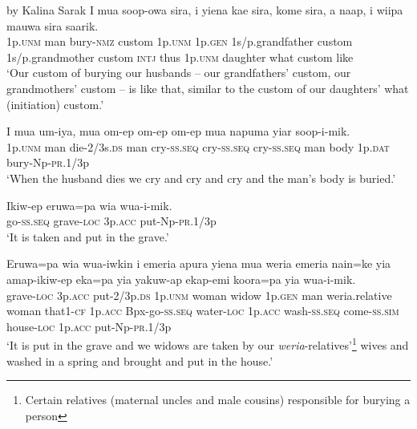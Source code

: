  by Kalina Sarak
\ea\label{ex:a:x1}
\gll  I  mua  soop-owa  sira,  i  yiena  kae  sira,                    kome  sira,  a  naap,  i  wiipa  mauwa  sira  saarik. \\
1p.\textsc{unm}  man  bury-\textsc{nmz}  custom  1p.\textsc{unm}  1p.\textsc{gen}  1s/p.grandfather  custom 1s/p.grandmother  custom  \textsc{intj}  thus  1p.\textsc{unm}  daughter  what  custom  like \\


\glt ‘Our custom of burying our husbands – our grandfathers’ custom, our grandmothers’ custom – is like that, similar to the custom of our daughters’ what (initiation) custom.’ \\
\z


\ea\label{ex:a:x2}
\gll  I  mua  um-iya,  mua  om-ep  om-ep  om-ep  mua                    napuma  yiar  soop-i-mik. \\
1p.\textsc{unm}  man  die-2/3s.\textsc{ds}  man  cry-\textsc{ss.seq}  cry-\textsc{ss.seq}  cry-\textsc{ss.seq}  man  body  1p.\textsc{dat}  bury-Np-\textsc{pr}.1/3p \\


\glt ‘When the husband dies we cry and cry and cry and the man’s body is buried.’ \\
\z


\ea\label{ex:a:x3}
\gll  Ikiw-ep  eruwa=pa  wia  wua-i-mik. \\
go-\textsc{ss.seq}  grave-\textsc{loc}  3p.\textsc{acc}  put-Np-\textsc{pr}.1/3p \\
\glt ‘It is taken and put in the grave.’ \\
\z


\ea\label{ex:a:x4}
\gll  Eruwa=pa  wia  wua-iwkin  i  emeria  apura  yiena      mua  weria  emeria  nain=ke  yia  amap-ikiw-ep  eka=pa                  yia  yakuw-ap  ekap-emi  koora=pa  yia  wua-i-mik. \\
grave-\textsc{loc}  3p.\textsc{acc}  put-2/3p.\textsc{ds}  1p.\textsc{unm}  woman  widow  1p.\textsc{gen} man  weria.relative  woman  that1-\textsc{cf}  1p.\textsc{acc}  Bpx-go-\textsc{ss.seq}  water-\textsc{loc}  1p.\textsc{acc}  wash-\textsc{ss.seq}  come-\textsc{ss}.\textsc{sim}  house-\textsc{loc}  1p.\textsc{acc}  put-Np-\textsc{pr}.1/3p \\




\glt ‘It is put in the grave and we widows are taken by our \textit{weria}{}-relatives’\footnote{ Certain relatives (maternal uncles and male cousins) responsible for burying a person} wives and washed in a spring and brought and put in the house.’ \\
\z


